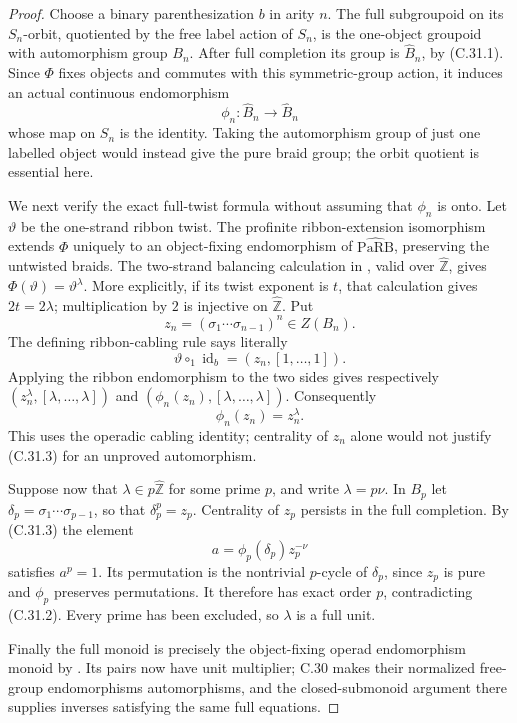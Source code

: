 \begin{proof}
Choose a binary parenthesization $b$ in arity $n$. The full subgroupoid
on its $S_n$-orbit, quotiented by the free label action of $S_n$, is
the one-object groupoid with automorphism group $B_n$. After full
completion its group is $\widehat B_n$, by (C.31.1). Since $\Phi$
fixes objects and commutes with this symmetric-group action, it
induces an actual continuous endomorphism
\[
                \phi_n:\widehat B_n\longrightarrow\widehat B_n
\]
whose map on $S_n$ is the identity. Taking the automorphism group of
just one labelled object would instead give the pure braid group;
the orbit quotient is essential here.

We next verify the exact full-twist formula without assuming that
$\phi_n$ is onto. Let $\vartheta$ be the one-strand ribbon twist.
The profinite ribbon-extension isomorphism
\cite[Proposition 8.1]{CEBHR2019} extends $\Phi$ uniquely to an
object-fixing endomorphism of $\widehat{\mathrm{PaRB}}$, preserving
the untwisted braids. The two-strand balancing calculation in
\cite[Proposition 7.7]{CEBHR2019}, valid over
$\widehat{\mathbb Z}$, gives
$\Phi(\vartheta)=\vartheta^\lambda$. More explicitly, if its
twist exponent is $t$, that calculation gives $2t=2\lambda$;
multiplication by $2$ is injective on $\widehat{\mathbb Z}$.
Put
\[
 z_n=(\sigma_1\cdots\sigma_{n-1})^n\in Z(B_n).
\]
The defining ribbon-cabling rule
\cite[Definition 6.4]{CEBHR2019} says literally
\[
 \vartheta\circ_1\operatorname{id}_b=(z_n,[1,\ldots,1]).
\]
Applying the ribbon endomorphism to the two sides gives respectively
$(z_n^\lambda,[\lambda,\ldots,\lambda])$ and
$(\phi_n(z_n),[\lambda,\ldots,\lambda])$. Consequently
\[
                         \phi_n(z_n)=z_n^\lambda.                \tag{C.31.3}
\]
This uses the operadic cabling identity; centrality of $z_n$ alone
would not justify (C.31.3) for an unproved automorphism.

Suppose now that $\lambda\in p\widehat{\mathbb Z}$ for some prime
$p$, and write $\lambda=p\nu$. In $B_p$ let
$\delta_p=\sigma_1\cdots\sigma_{p-1}$, so that
$\delta_p^p=z_p$. Centrality of $z_p$ persists in the full completion.
By (C.31.3) the element
\[
                  a=\phi_p(\delta_p)z_p^{-\nu}
\]
satisfies $a^p=1$. Its permutation is the nontrivial $p$-cycle of
$\delta_p$, since $z_p$ is pure and $\phi_p$ preserves permutations.
It therefore has exact order $p$, contradicting (C.31.2). Every
prime has been excluded, so $\lambda$ is a full unit.

Finally the full monoid is precisely the object-fixing operad
endomorphism monoid by \cite[Proposition 7.3]{CEBHR2019}. Its pairs
now have unit multiplier; C.30 makes their normalized free-group
endomorphisms automorphisms, and the closed-submonoid argument there
supplies inverses satisfying the same full equations.
\end{proof}

